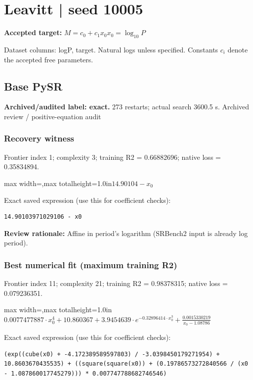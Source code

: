 \documentclass[10pt,letterpaper,landscape]{article}
\begin{document}
\section*{Leavitt | seed 10005}
\textbf{Accepted target:} $\displaystyle M=c_0+c_1x_0$\hfill $x_0=\log_{10}P$\par
{\small Dataset columns: logP, target. Natural logs unless specified. Constants $c_i$ denote the accepted free parameters.}\par\medskip
\begin{minipage}[t]{0.485\textwidth}
\subsection*{Base PySR}
\textbf{Archived/audited label: exact.} 273 restarts; actual search 3600.5 s.
{\small Archived review / positive-equation audit}
\subsubsection*{Recovery witness}
Frontier index 1; complexity 3; training R2 = 0.66882696; native loss = 0.35834894.
\begin{center}\begin{adjustbox}{max width=\linewidth,max totalheight=1.0in}$\displaystyle 14.90104 - x_{0}$\end{adjustbox}\end{center}
{\scriptsize Exact saved expression (use this for coefficient checks):}
\begin{lstlisting}
14.90103971029106 - x0
\end{lstlisting}
{\small\textbf{Review rationale:} Affine in period's logarithm (SRBench2 input is already log period).}
\subsubsection*{Best numerical fit (maximum training R2)}
Frontier index 11; complexity 21; training R2 = 0.98378315; native loss = 0.079236351.
\begin{center}\begin{adjustbox}{max width=\linewidth,max totalheight=1.0in}$\displaystyle 0.0077477887 \cdot x_{0}^{4} + 10.860367 + 3.9454639 \cdot e^{- 0.32896414 \cdot x_{0}^{3}} + \frac{0.0015330219}{x_{0} - 1.08786}$\end{adjustbox}\end{center}
{\scriptsize Exact saved expression (use this for coefficient checks):}
\begin{lstlisting}
(exp((cube(x0) + -4.172389589597803) / -3.0398450179271954) + 10.8603670435535) + ((square(square(x0)) + (0.19786573272840566 / (x0 - 1.087860017745279))) * 0.007747788682746546)
\end{lstlisting}
\end{minipage}\hfill
\end{document}
